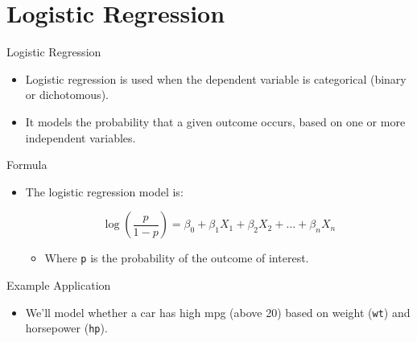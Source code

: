 \documentclass[
  18 pt,
  ignorenonframetext,
  aspectratio=1610,
]{beamer}
\providecommand{\tightlist}{%
  \setlength{\itemsep}{0pt}\setlength{\parskip}{0pt}}\usepackage{longtable,booktabs,array}
\begin{document}
\hypertarget{logistic-regression-1}{%
\section{Logistic Regression}\label{logistic-regression-1}}

\begin{frame}[fragile]{Logistic Regression}
\protect\hypertarget{logistic-regression-2}{}
\begin{itemize}
\tightlist
\item
  Logistic regression is used when the dependent variable is categorical
  (binary or dichotomous).
\item
  It models the probability that a given outcome occurs, based on one or
  more independent variables.
\end{itemize}

\begin{block}{Formula}
\protect\hypertarget{formula-2}{}
\begin{itemize}
\item
  The logistic regression model is:

  \[ \log\left(\frac{p}{1 - p}\right) = \beta_0 + \beta_1 X_1 + \beta_2 X_2 + \dots + \beta_n X_n \]

  \begin{itemize}
  \tightlist
  \item
    Where \texttt{p} is the probability of the outcome of interest.
  \end{itemize}
\end{itemize}
\end{block}

\begin{block}{Example Application}
\protect\hypertarget{example-application}{}
\begin{itemize}
\tightlist
\item
  We'll model whether a car has high mpg (above 20) based on weight
  (\texttt{wt}) and horsepower (\texttt{hp}).
\end{itemize}
\end{block}
\end{frame}
\end{document}
